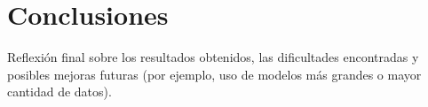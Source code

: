 \section{Conclusiones}
\label{sec:conclusiones}

Reflexión final sobre los resultados obtenidos, las dificultades encontradas y posibles mejoras futuras (por ejemplo, uso de modelos más grandes o mayor cantidad de datos).
